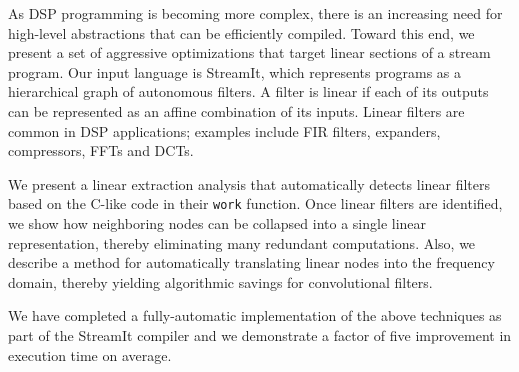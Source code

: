 As DSP programming is becoming more complex, there is an increasing
need for high-level abstractions that can be efficiently compiled.
Toward this end, we present a set of aggressive optimizations that
target linear sections of a stream program.  Our input language is
StreamIt, which represents programs as a hierarchical graph of
autonomous filters.  A filter is linear if each of its outputs can be
represented as an affine combination of its inputs.  Linear filters
are common in DSP applications; examples include FIR filters,
expanders, compressors, FFTs and DCTs.

We present a linear extraction analysis that automatically detects
linear filters based on the C-like code in their {\tt work} function.
Once linear filters are identified, we show how neighboring nodes can
be collapsed into a single linear representation, thereby eliminating
many redundant computations.  Also, we describe a method for
automatically translating linear nodes into the frequency domain,
thereby yielding algorithmic savings for convolutional filters.

We have completed a fully-automatic implementation of the above
techniques as part of the StreamIt compiler and we demonstrate
a factor of five improvement in execution time on average.

